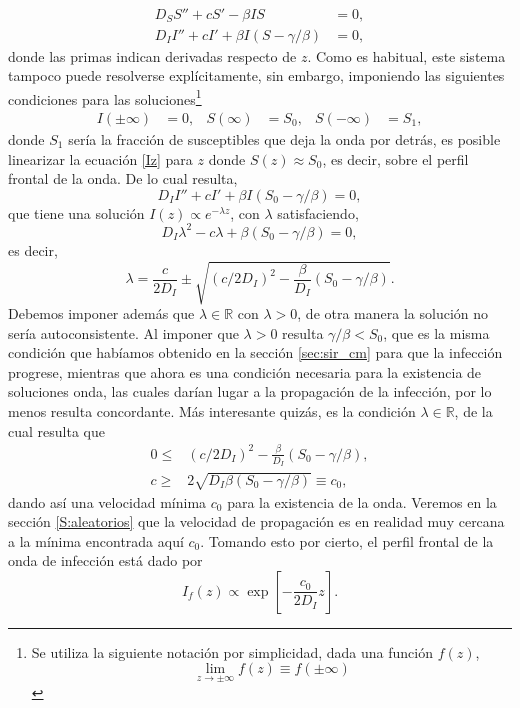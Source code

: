 \begin{align}
  D_S S''+ cS'-\beta IS &=0,\label{Sz} \\[.3cm] D_I I'' + cI' + \beta I(S-\gamma/\beta)&=0, \label{Iz}
\end{align}
donde las primas indican derivadas respecto de $z$. Como es habitual, este sistema tampoco puede resolverse explícitamente, sin embargo, imponiendo las 
siguientes condiciones para las soluciones\footnote{Se utiliza la siguiente notación por simplicidad, dada una función $f(z)$, 
\[\lim_{z\to\pm\infty}f(z)\equiv f(\pm\infty)\]}
\begin{align*}
  I(\pm\infty)&=0,   &  S(\infty) &= S_0,  & S(-\infty) &= S_1,   
\end{align*}
donde $S_1$ sería la fracción de susceptibles que deja la onda por detrás, es posible linearizar la ecuación \ref{Iz} para $z$ donde $S(z)\approx S_0$,
es decir, sobre el perfil frontal de la onda. De lo cual resulta,
\begin{equation}
  D_I I'' + cI'+\beta I(S_0-\gamma/\beta)=0,\label{Idez}
\end{equation}
que tiene una solución $I(z)\propto e^{-\lambda z}$, con $\lambda$ satisfaciendo,
\[D_I \lambda^2 - c \lambda +\beta(S_0-\gamma/\beta)=0,\]
es decir,
\[\lambda = \frac{c}{2D_I}\pm \sqrt{(c/2D_I)^2-\frac{\beta}{D_I}(S_0-\gamma/\beta)}.\]
Debemos imponer además que $\lambda \in \mathds R$ con $\lambda>0$, de otra manera la solución no sería autoconsistente. Al imponer que $\lambda>0$ 
resulta $\gamma/\beta<S_0$, que es la misma condición que habíamos obtenido en la sección \ref{sec:sir_cm} para que la infección progrese, 
mientras que ahora es una condición necesaria para la existencia de soluciones onda, las cuales darían lugar a la 
propagación de la infección, por lo menos resulta concordante. Más interesante quizás, es la condición $\lambda \in \mathds{R}$, de la cual resulta que 
\begin{align*}
  0\leq&(c/2D_I)^2-\frac{\beta}{D_I}(S_0-\gamma/\beta),\\[.3cm]
  c\geq&2\sqrt{D_I\beta(S_0-\gamma/\beta)}\equiv c_0,
\end{align*}
dando así una velocidad mínima $c_0$ para la existencia de la onda. Veremos en la sección \ref{S:aleatorios} que la velocidad de propagación es en realidad
muy cercana a la mínima encontrada aquí $c_0$. Tomando esto por cierto, el perfil frontal de la onda de infección está dado por 
\begin{equation}
  I_f(z)\propto \exp[-\frac{c_0}{2D_I}z].\label{larika2}  
\end{equation}

